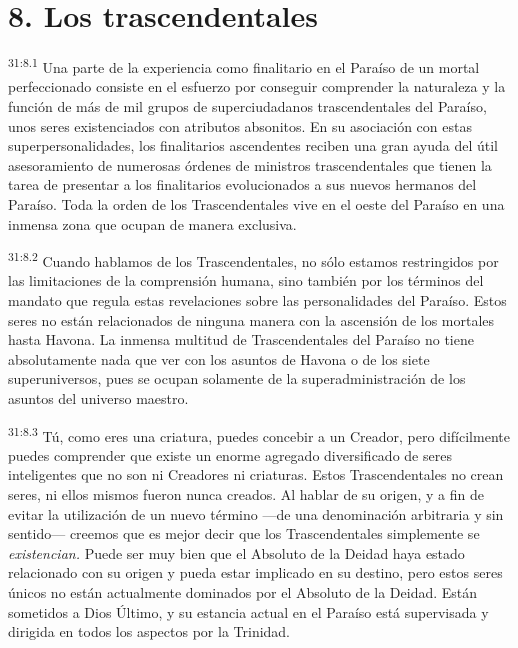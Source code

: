 \section*{8. Los trascendentales}
\par
\textsuperscript{31:8.1} Una parte de la experiencia como finalitario en el Paraíso de un mortal perfeccionado consiste en el esfuerzo por conseguir comprender la naturaleza y la función de más de mil grupos de superciudadanos trascendentales del Paraíso, unos seres existenciados con atributos absonitos. En su asociación con estas superpersonalidades, los finalitarios ascendentes reciben una gran ayuda del útil asesoramiento de numerosas órdenes de ministros trascendentales que tienen la tarea de presentar a los finalitarios evolucionados a sus nuevos hermanos del Paraíso. Toda la orden de los Trascendentales vive en el oeste del Paraíso en una inmensa zona que ocupan de manera exclusiva.

\par
\textsuperscript{31:8.2} Cuando hablamos de los Trascendentales, no sólo estamos restringidos por las limitaciones de la comprensión humana, sino también por los términos del mandato que regula estas revelaciones sobre las personalidades del Paraíso. Estos seres no están relacionados de ninguna manera con la ascensión de los mortales hasta Havona. La inmensa multitud de Trascendentales del Paraíso no tiene absolutamente nada que ver con los asuntos de Havona o de los siete superuniversos, pues se ocupan solamente de la superadministración de los asuntos del universo maestro.

\par
\textsuperscript{31:8.3} Tú, como eres una criatura, puedes concebir a un Creador, pero difícilmente puedes comprender que existe un enorme agregado diversificado de seres inteligentes que no son ni Creadores ni criaturas. Estos Trascendentales no crean seres, ni ellos mismos fueron nunca creados. Al hablar de su origen, y a fin de evitar la utilización de un nuevo término ---de una denominación arbitraria y sin sentido--- creemos que es mejor decir que los Trascendentales simplemente se \textit{existencian.} Puede ser muy bien que el Absoluto de la Deidad haya estado relacionado con su origen y pueda estar implicado en su destino, pero estos seres únicos no están actualmente dominados por el Absoluto de la Deidad. Están sometidos a Dios Último, y su estancia actual en el Paraíso está supervisada y dirigida en todos los aspectos por la Trinidad.

